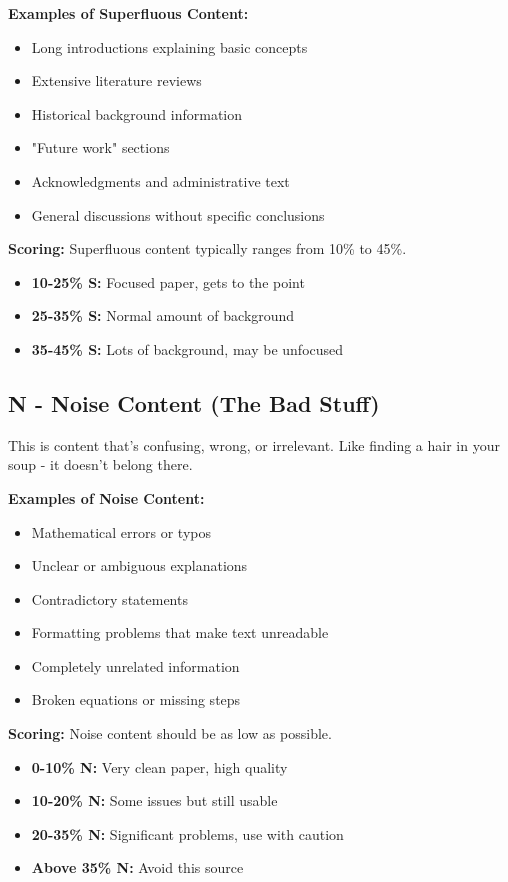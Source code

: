 \documentclass[11pt,a4paper]{article}
\begin{document}
\textbf{Examples of Superfluous Content:}
\begin{itemize}[leftmargin=*]
\item Long introductions explaining basic concepts
\item Extensive literature reviews
\item Historical background information
\item "Future work" sections
\item Acknowledgments and administrative text
\item General discussions without specific conclusions
\end{itemize}

\textbf{Scoring:} Superfluous content typically ranges from 10\% to 45\%.
\begin{itemize}
\item \textbf{10-25\% S:} Focused paper, gets to the point
\item \textbf{25-35\% S:} Normal amount of background
\item \textbf{35-45\% S:} Lots of background, may be unfocused
\end{itemize}

\subsection{N - Noise Content (The Bad Stuff)}

\begin{tcolorbox}[colback=warningred!10,colframe=warningred,title=What is Noise Content?]
This is content that's confusing, wrong, or irrelevant. Like finding a hair in your soup - it doesn't belong there.
\end{tcolorbox}

\textbf{Examples of Noise Content:}
\begin{itemize}[leftmargin=*]
\item Mathematical errors or typos
\item Unclear or ambiguous explanations
\item Contradictory statements
\item Formatting problems that make text unreadable
\item Completely unrelated information
\item Broken equations or missing steps
\end{itemize}

\textbf{Scoring:} Noise content should be as low as possible.
\begin{itemize}
\item \textbf{0-10\% N:} Very clean paper, high quality
\item \textbf{10-20\% N:} Some issues but still usable
\item \textbf{20-35\% N:} Significant problems, use with caution
\item \textbf{Above 35\% N:} Avoid this source
\end{itemize}
\end{document}
